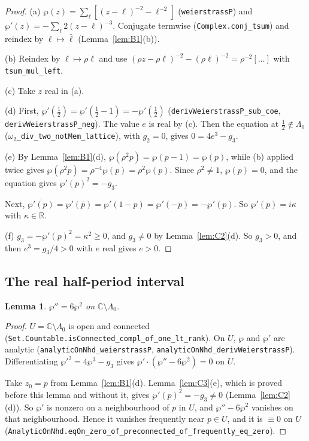\documentclass[11pt]{article}
\newtheorem{lemma}[theorem]{Lemma}
\theoremstyle{definition}
\theoremstyle{remark}
\newcommand{\C}{\mathbb C}
\newcommand{\R}{\mathbb R}
\newcommand{\LamO}{\Lambda_0}
\newcommand{\lean}[1]{\texttt{#1}}
\begin{document}
\begin{proof}
(a) $\wp(z)=\sum_\ell[(z-\ell)^{-2}-\ell^{-2}]$ (\lean{weierstrassP}) and
$\wp'(z)=-\sum_\ell2(z-\ell)^{-3}$. Conjugate termwise (\lean{Complex.conj\_tsum}) and reindex by
$\ell\mapsto\bar\ell$ (Lemma~\ref{lem:B1}(b)).

(b) Reindex by $\ell\mapsto\rho\ell$ and use $(\rho z-\rho\ell)^{-2}-(\rho\ell)^{-2}=\rho^{-2}[\dots]$ with
\lean{tsum\_mul\_left}.

(c) Take $z$ real in (a).

(d) First, $\wp'(\tfrac12)=\wp'(\tfrac12-1)=-\wp'(\tfrac12)$ (\lean{derivWeierstrassP\_sub\_coe},
\lean{derivWeierstrassP\_neg}). The value $e$ is real by (c). Then the equation at $\tfrac12\notin\LamO$
(\lean{$\omega_2$\_div\_two\_notMem\_lattice}), with $g_2=0$, gives $0=4e^3-g_3$.

(e) By Lemma~\ref{lem:B1}(d), $\wp(\rho^2p)=\wp(p-1)=\wp(p)$, while (b) applied twice gives
$\wp(\rho^2p)=\rho^{-4}\wp(p)=\rho^2\wp(p)$. Since $\rho^2\ne1$, $\wp(p)=0$, and the equation gives
$\wp'(p)^2=-g_3$.

Next, $\overline{\wp'(p)}=\wp'(\bar p)=\wp'(1-p)=\wp'(-p)=-\wp'(p)$. So $\wp'(p)=i\kappa$ with $\kappa\in\R$.

(f) $g_3=-\wp'(p)^2=\kappa^2\ge0$, and $g_3\ne0$ by Lemma~\ref{lem:C2}(d). So $g_3>0$, and then
$e^3=g_3/4>0$ with $e$ real gives $e>0$.
\end{proof}

\subsection{The real half-period interval}

\begin{lemma}\label{lem:C4}
$\wp''=6\wp^2$ on $\C\setminus\LamO$.
\end{lemma}

\begin{proof}
$U=\C\setminus\LamO$ is open and connected
(\lean{Set.Countable.isConnected\_compl\_of\_one\_lt\_rank}). On $U$,
$\wp$ and $\wp'$ are analytic (\lean{analyticOnNhd\_weierstrassP}, \lean{analyticOnNhd\_derivWeierstrassP}).
Differentiating $\wp'^2=4\wp^3-g_3$ gives $\wp'\cdot(\wp''-6\wp^2)=0$ on $U$.

Take $z_0=p$ from Lemma~\ref{lem:B1}(d). Lemma~\ref{lem:C3}(e), which is proved before this lemma and without
it, gives $\wp'(p)^2=-g_3\neq0$ (Lemma~\ref{lem:C2}(d)). So $\wp'$ is nonzero on a neighbourhood of $p$ in $U$, and
$\wp''-6\wp^2$ vanishes on that neighbourhood. Hence it vanishes frequently near $p\in U$, and it is $\equiv0$ on
$U$ (\lean{AnalyticOnNhd.eqOn\_zero\_of\_preconnected\_of\_frequently\_eq\_zero}).
\end{proof}
\end{document}
